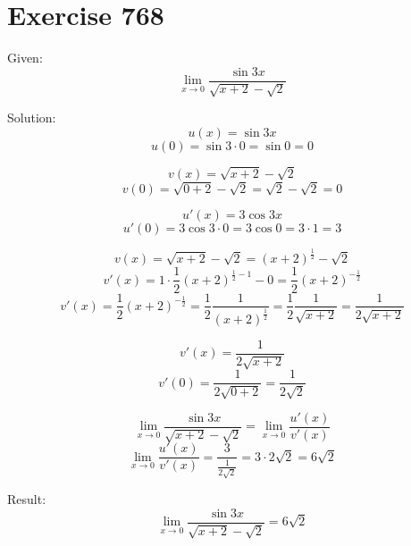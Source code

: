 \documentclass[a4paper, 10pt]{scrartcl}
\begin{document}
\section{Exercise 768}

Given:
\[\lim_{x\to 0}{\frac{\sin{3x}}{\sqrt{x + 2} - \sqrt{2}}}\]

Solution:
\[u(x) = \sin{3x}\]
\[u(0) = \sin{3\cdot 0} = \sin{0} = 0\]

\[v(x) = \sqrt{x + 2} - \sqrt{2}\]
\[v(0) = \sqrt{0 + 2} - \sqrt{2} = \sqrt{2} - \sqrt{2} = 0\]

\[u'(x) = 3\cos{3x}\]
\[u'(0) = 3\cos{3\cdot 0} = 3\cos{0} = 3\cdot 1 = 3\]

\[v(x) = \sqrt{x + 2} - \sqrt{2} = (x + 2)^{\frac{1}{2}} - \sqrt{2}\]
\[v'(x) = 1\cdot\frac{1}{2}(x + 2)^{\frac{1}{2} - 1} - 0 = \frac{1}{2}(x + 2)^{-\frac{1}{2}}\]
\[v'(x) = \frac{1}{2}(x + 2)^{-\frac{1}{2}} = \frac{1}{2}\frac{1}{(x + 2)^{\frac{1}{2}}} =
          \frac{1}{2}\frac{1}{\sqrt{x + 2}} = \frac{1}{2\sqrt{x + 2}}\]

\[v'(x) = \frac{1}{2\sqrt{x + 2}}\]
\[v'(0) = \frac{1}{2\sqrt{0 + 2}} = \frac{1}{2\sqrt{2}}\]

\[\lim_{x\to 0}{\frac{\sin{3x}}{\sqrt{x + 2} - \sqrt{2}}} = \lim_{x\to 0}{\frac{u'(x)}{v'(x)}}\]
\[\lim_{x\to 0}{\frac{u'(x)}{v'(x)}} = \frac{3}{\frac{1}{2\sqrt{2}}} = 3\cdot2\sqrt{2} =
    6\sqrt{2}\]

Result:
\[\lim_{x\to 0}{\frac{\sin{3x}}{\sqrt{x + 2} - \sqrt{2}}} = 6\sqrt{2}\]
\end{document}
